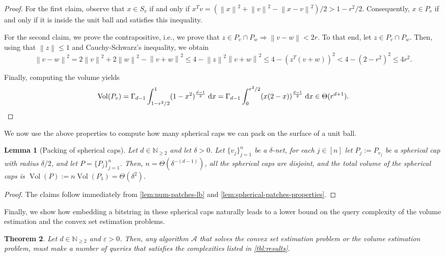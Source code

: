 \documentclass[11pt]{article}
\newtheorem{theorem}{Theorem}[section]
\newtheorem{lemma}[theorem]{Lemma}
\newcommand{\A}{\ensuremath{\mathcal{A}}}
\newcommand{\N}{\ensuremath{\mathbb{N}}}
\newcommand{\norm}[1]{\ensuremath{\left\|#1\right\|}}
\DeclareMathOperator{\Vol}{Vol}
\begin{document}
    \begin{proof}
        For the first claim, observe that $x \in S_v$ if and only if $x^Tv = (\norm{x}^2 + \norm{v}^2 - \norm{x-v}^2)/2 > 1-r^2/2$. Consequently, $x \in P_v$ if and only if it is inside the unit ball and satisfies this inequality.

        For the second claim, we prove the contrapositive, i.e., we prove that $z \in P_v \cap P_w \Rightarrow \norm{v-w} < 2r$. To that end, let $z \in P_v \cap P_w$. Then, using that $\norm{z} \leq 1$ and Cauchy-Schwarz's inequality, we obtain
        \[\norm{v-w}^2 = 2\norm{v}^2 + 2\norm{w}^2 - \norm{v+w}^2 \leq 4 - \norm{z}^2\norm{v+w}^2 \leq 4 - (z^T(v+w))^2 < 4 - (2 - r^2)^2 \leq 4r^2.\]

        Finally, computing the volume yields
        \[\Vol(P_v) = \Gamma_{d-1}\int_{1-r^2/2}^1 (1-x^2)^{\frac{d-1}{2}} \;\mathrm{d}x = \Gamma_{d-1} \int_0^{r^2/2} (x(2-x))^{\frac{d-1}{2}} \;\mathrm{d}x \in \Theta(r^{d+1}).\qedhere\]
    \end{proof}

    We now use the above properties to compute how many spherical caps we can pack on the surface of a unit ball.

    \begin{lemma}[Packing of spherical caps]
        \label{lem:spherical-cap-packing}
        Let $d \in \N_{\geq2}$ and let $\delta > 0$. Let $\{v_j\}_{j=1}^n$ be a $\delta$-net, for each $j \in [n]$ let $P_j := P_{v_j}$ be a spherical cap with radius $\delta/2$, and let $P = \{P_j\}_{j=1}^n$. Then, $n = \Theta(\delta^{-(d-1)})$, all the spherical caps are disjoint, and the total volume of the spherical caps is $\Vol(P) := n\Vol(P_1) = \Theta(\delta^2)$.
    \end{lemma}

    \begin{proof}
        The claims follow immediately from \cref{lem:num-patches-lb} and \cref{lem:spherical-patches-properties}.
    \end{proof}

    Finally, we show how embedding a bitstring in these spherical caps naturally leads to a lower bound on the query complexity of the volume estimation and the convex set estimation problems.

    \begin{theorem}
        \label{thm:lbs}
        Let $d \in \N_{\geq 2}$ and $\varepsilon > 0$. Then, any algorithm $\A$ that solves the convex set estimation problem or the volume estimation problem, must make a number of queries that satisfies the complexities listed in \cref{tbl:results}.
    \end{theorem}
\end{document}

